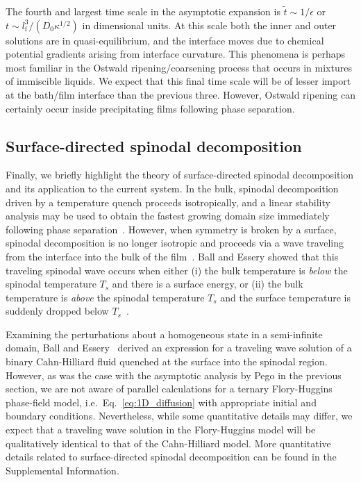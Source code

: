 \documentclass[journal=mamobx, layout=twocolumn]{achemso}
\newcommand{\txtf}{\mathrm{f}}
\begin{document}
The fourth and largest time scale in the asymptotic expansion is $\tilde{t} \sim 1/\epsilon$ or $t \sim l_{\txtf}^{3}/(D_{0} \kappa^{1/2})$ in dimensional units. 
At this scale both the inner and outer solutions are in quasi-equilibrium, and the interface moves due to chemical potential gradients arising from interface curvature.
This phenomena is perhaps most familiar in the Ostwald ripening/coarsening process that occurs in mixtures of immiscible liquids.
We expect that this final time scale will be of lesser import at the bath/film interface than the previous three. 
However, Ostwald ripening can certainly occur inside precipitating films following phase separation.

\subsection{Surface-directed spinodal decomposition}

Finally, we briefly highlight the theory of surface-directed spinodal decomposition and its application to the current system.
In the bulk, spinodal decomposition driven by a temperature quench proceeds isotropically, and a linear stability analysis may be used to obtain the fastest growing domain size immediately following phase separation~\cite{Tree2017}.
However, when symmetry is broken by a surface, spinodal decomposition is no longer isotropic and proceeds via a wave traveling from the interface into the bulk of the film~\cite{Marko1993,Ball1990}.
Ball and Essery showed that this traveling spinodal wave occurs when either (i) the bulk temperature is \emph{below} the spinodal temperature $T_{s}$ and there is a surface energy, or (ii) the bulk temperature is \emph{above} the spinodal temperature $T_{s}$ and the surface temperature is suddenly dropped below $T_{s}$~\cite{Ball1990}.

Examining the perturbations about a homogeneous state in a semi-infinite domain, Ball and Essery~\cite{Ball1990} derived an expression for a traveling wave solution of a binary Cahn-Hilliard fluid quenched at the surface into the spinodal region.
However, as was the case with the asymptotic analysis by Pego in the previous section, we are not aware of parallel calculations for a ternary Flory-Huggins phase-field model, i.e.\ Eq.~\ref{eq:1D_diffusion} with appropriate initial and boundary conditions.
Nevertheless, while some quantitative details may differ, we expect that a traveling wave solution in the Flory-Huggins model will be qualitatively identical to that of the Cahn-Hilliard model.
More quantitative details related to surface-directed spinodal decomposition can be found in the Supplemental Information.
\end{document}
